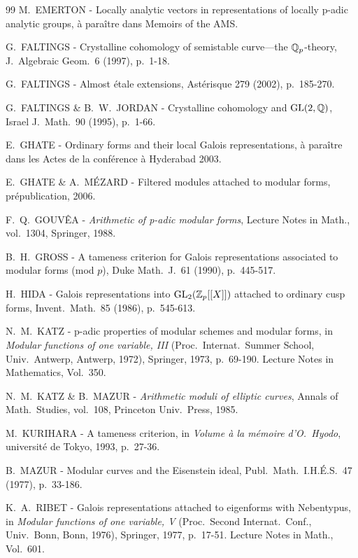 \begin{thebibliography}{99}
 M.~EMERTON - Locally analytic vectors in representations of locally p-adic analytic groups, \`a para\^itre dans Memoirs of the AMS.

 G.~FALTINGS - Crystalline cohomology of semistable curve---the $\mathbb{Q}_p$-theory, J.\ Algebraic Geom.\ 6 (1997), p.~1-18.

 G.~FALTINGS - Almost \'etale extensions, Ast\'erisque 279 (2002), p.~185-270.

 G.~FALTINGS \& B.~W.~JORDAN - Crystalline cohomology and $\mathrm{GL}(2,\mathbb{Q})$, Israel J.\ Math.\ 90 (1995), p.~1-66.

 E.~GHATE - Ordinary forms and their local Galois representations, \`a para\^itre dans les Actes de la conf\'erence \`a Hyderabad 2003.

 E.~GHATE \& A.~M\'EZARD - Filtered modules attached to modular forms, pr\'epublication, 2006.

 F.~Q.~GOUV\^EA - \emph{Arithmetic of p-adic modular forms}, Lecture Notes in Math., vol.~1304, Springer, 1988.

 B.~H.~GROSS - A tameness criterion for Galois representations associated to modular forms (mod $p$), Duke Math.\ J.\ 61 (1990), p.~445-517.

 H.~HIDA - Galois representations into $\mathrm{GL}_2(\mathbb{Z}_p[[X]])$ attached to ordinary cusp forms, Invent.\ Math.\ 85 (1986), p.~545-613.

 N.~M.~KATZ - p-adic properties of modular schemes and modular forms, in \emph{Modular functions of one variable, III} (Proc.\ Internat.\ Summer School, Univ.\ Antwerp, Antwerp, 1972), Springer, 1973, p.~69-190. Lecture Notes in Mathematics, Vol.~350.

 N.~M.~KATZ \& B.~MAZUR - \emph{Arithmetic moduli of elliptic curves}, Annals of Math.\ Studies, vol.~108, Princeton Univ.\ Press, 1985.

 M.~KURIHARA - A tameness criterion, in \emph{Volume \`a la m\'emoire d'O.\ Hyodo}, universit\'e de Tokyo, 1993, p.~27-36.

 B.~MAZUR - Modular curves and the Eisenstein ideal, Publ.\ Math.\ I.H.\'E.S.\ 47 (1977), p.~33-186.

 K.~A.~RIBET - Galois representations attached to eigenforms with Nebentypus, in \emph{Modular functions of one variable, V} (Proc.\ Second Internat.\ Conf., Univ.\ Bonn, Bonn, 1976), Springer, 1977, p.~17-51. Lecture Notes in Math., Vol.~601.


\end{thebibliography}
